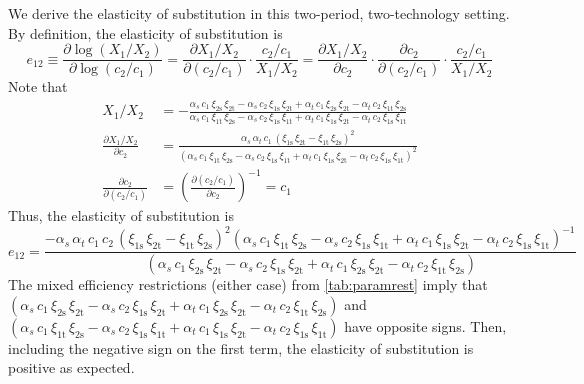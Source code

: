\documentclass[11pt,a4paper,leqno]{extarticle}
\begin{document}
	We derive the elasticity of substitution in this two-period, two-technology setting. By definition, the elasticity of substitution is 
	$$e_{12} \equiv \frac{\partial \log(X_1/X_2)}{\partial \log(c_2/c_1)} = \frac{\partial X_1/X_2 }{ \partial (c_2/c_1)} \cdot \frac{c_2/c_1}{X_1/X_2} = \frac{\partial X_1/X_2}{ \partial  c_2}  \cdot \frac{\partial c_2}{\partial (c_2/c_1)} \cdot \frac{c_2/c_1}{X_1/X_2} $$
	Note that
	\begin{align*}
		X_1/X_2 &= -\frac{\alpha _{s}\,c_{1}\,\xi _{\mathrm{2s}}\,\xi _{\mathrm{2t}}-\alpha _{s}\,c_{2}\,\xi _{\mathrm{1s}}\,\xi _{\mathrm{2t}}+\alpha _{t}\,c_{1}\,\xi _{\mathrm{2s}}\,\xi _{\mathrm{2t}}-\alpha _{t}\,c_{2}\,\xi _{\mathrm{1t}}\,\xi _{\mathrm{2s}}}{\alpha _{s}\,c_{1}\,\xi _{\mathrm{1t}}\,\xi _{\mathrm{2s}}-\alpha _{s}\,c_{2}\,\xi _{\mathrm{1s}}\,\xi _{\mathrm{1t}}+\alpha _{t}\,c_{1}\,\xi _{\mathrm{1s}}\,\xi _{\mathrm{2t}}-\alpha _{t}\,c_{2}\,\xi _{\mathrm{1s}}\,\xi _{\mathrm{1t}}} \\
		\frac{\partial X_1/X_2}{\partial c_2} &= \frac{\alpha _{s}\,\alpha _{t}\,c_{1}\,{\left(\xi _{\mathrm{1s}}\,\xi _{\mathrm{2t}}-\xi _{\mathrm{1t}}\,\xi _{\mathrm{2s}}\right)}^2}{{\left(\alpha _{s}\,c_{1}\,\xi _{\mathrm{1t}}\,\xi _{\mathrm{2s}}-\alpha _{s}\,c_{2}\,\xi _{\mathrm{1s}}\,\xi _{\mathrm{1t}}+\alpha _{t}\,c_{1}\,\xi _{\mathrm{1s}}\,\xi _{\mathrm{2t}}-\alpha _{t}\,c_{2}\,\xi _{\mathrm{1s}}\,\xi _{\mathrm{1t}}\right)}^2}	 \\
		\frac{\partial c_2}{\partial (c_2/c_1)} &= \left( \frac{\partial (c_2/c_1)}{\partial c_2} \right)^{-1} = c_1
	\end{align*}
	Thus, the elasticity of substitution is
	$$
	e_{12} = 
	\frac{-\alpha _{s}\,\alpha _{t}\,c_{1}\,c_{2}\,{\left(\xi _{\mathrm{1s}}\,\xi _{\mathrm{2t}}-\xi _{\mathrm{1t}}\,\xi _{\mathrm{2s}}\right)}^2 \left(\alpha _{s}\,c_{1}\,\xi _{\mathrm{1t}}\,\xi _{\mathrm{2s}}-\alpha _{s}\,c_{2}\,\xi _{\mathrm{1s}}\,\xi _{\mathrm{1t}}+\alpha _{t}\,c_{1}\,\xi _{\mathrm{1s}}\,\xi _{\mathrm{2t}}-\alpha _{t}\,c_{2}\,\xi _{\mathrm{1s}}\,\xi _{\mathrm{1t}}\right)^{-1}}{
		\,\left(\alpha _{s}\,c_{1}\,\xi _{\mathrm{2s}}\,\xi _{\mathrm{2t}}-\alpha _{s}\,c_{2}\,\xi _{\mathrm{1s}}\,\xi _{\mathrm{2t}}+\alpha _{t}\,c_{1}\,\xi _{\mathrm{2s}}\,\xi _{\mathrm{2t}}-\alpha _{t}\,c_{2}\,\xi _{\mathrm{1t}}\,\xi _{\mathrm{2s}}\right)
	}
	$$
	The mixed efficiency restrictions (either case) from \autoref{tab:paramrest} imply that $(\alpha _{s}\,c_{1}\,\xi _{\mathrm{2s}}\,\xi _{\mathrm{2t}}-\alpha _{s}\,c_{2}\,\xi _{\mathrm{1s}}\,\xi _{\mathrm{2t}}+\alpha _{t}\,c_{1}\,\xi _{\mathrm{2s}}\,\xi _{\mathrm{2t}}-\alpha _{t}\,c_{2}\,\xi _{\mathrm{1t}}\,\xi _{\mathrm{2s}})$ and $(\alpha _{s}\,c_{1}\,\xi _{\mathrm{1t}}\,\xi _{\mathrm{2s}}-\alpha _{s}\,c_{2}\,\xi _{\mathrm{1s}}\,\xi _{\mathrm{1t}}+\alpha _{t}\,c_{1}\,\xi _{\mathrm{1s}}\,\xi _{\mathrm{2t}}-\alpha _{t}\,c_{2}\,\xi _{\mathrm{1s}}\,\xi _{\mathrm{1t}})$ have opposite signs. Then, including the negative sign on the first term, the elasticity of substitution is positive as expected. 	
	
\end{document}
